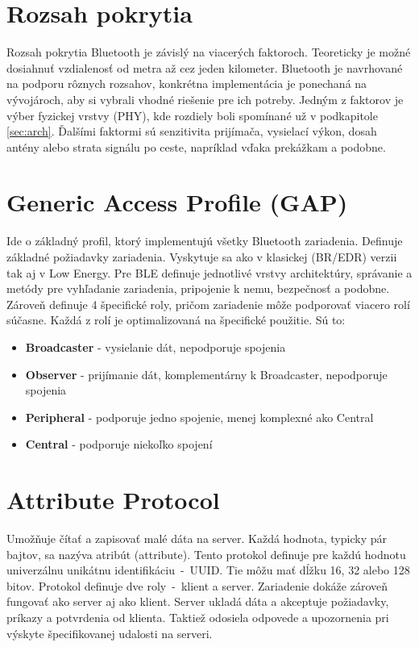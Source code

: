 \section{Rozsah pokrytia}

Rozsah pokrytia Bluetooth je závislý na viacerých faktoroch. Teoreticky je možné dosiahnuť vzdialenosť od metra až cez jeden kilometer. Bluetooth je navrhované na podporu rôznych rozsahov, konkrétna implementácia je ponechaná na vývojároch, aby si vybrali vhodné riešenie pre ich potreby. Jedným z faktorov je výber fyzickej vrstvy (PHY), kde rozdiely boli spomínané už v podkapitole \ref{sec:arch}. Ďalšími faktormi sú senzitivita prijímača, vysielací výkon, dosah antény alebo strata signálu po ceste, napríklad vďaka prekážkam a podobne.\cite{bluetooth}

\section{Generic Access Profile (GAP)}\label{sec:gap}

Ide o základný profil, ktorý implementujú všetky Bluetooth zariadenia. Definuje základné požiadavky zariadenia. Vyskytuje sa ako v klasickej (BR/EDR) verzii tak aj v Low Energy. Pre BLE definuje jednotlivé vrstvy architektúry, správanie a metódy pre vyhľadanie zariadenia, pripojenie k nemu, bezpečnosť a podobne.
Zároveň definuje 4 špecifické roly, pričom zariadenie môže podporovať viacero rolí súčasne. Každá z rolí je optimalizovaná na špecifické použitie. Sú to:
\begin{itemize}
    \item \textbf{Broadcaster} - vysielanie dát, nepodporuje spojenia
    \item \textbf{Observer} - prijímanie dát, komplementárny k Broadcaster, nepodporuje spojenia
    \item \textbf{Peripheral} - podporuje jedno spojenie, menej komplexné ako Central
    \item \textbf{Central} - podporuje niekoľko spojení\cite{bluetooth}
\end{itemize}

\section{Attribute Protocol}

Umožňuje čítať a zapisovať malé dáta na server. Každá hodnota, typicky pár bajtov, sa nazýva atribút (attribute). Tento protokol definuje pre každú hodnotu univerzálnu unikátnu identifikáciu~-~UUID. Tie môžu mať dĺžku 16, 32 alebo 128 bitov.
Protokol definuje dve roly~-~klient a server. Zariadenie dokáže zároveň fungovať ako server aj ako klient. Server ukladá dáta a akceptuje požiadavky, príkazy a potvrdenia od klienta. Taktiež odosiela odpovede a upozornenia pri výskyte špecifikovanej udalosti na serveri.\cite{bluetooth}

